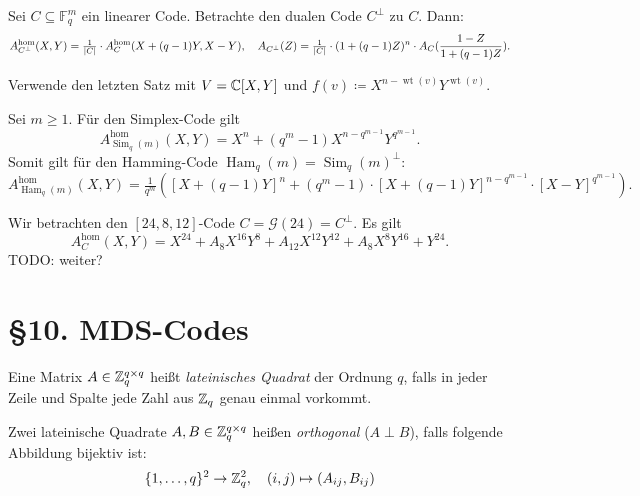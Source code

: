 \documentclass{cheat-sheet}
\newcommand{\F}{\mathbb{F}} %
\DeclareMathOperator{\wt}{wt} %
\newcommand{\homogen}{\text{hom}} %
\DeclareMathOperator{\Ham}{Ham} %
\DeclareMathOperator{\Sim}{Sim} %
\newcommand{\Golay}{\mathcal{G}} %
\begin{document}
\begin{satz}
  Sei $C \subseteq \F_q^m$ ein linearer Code.
  Betrachte den dualen Code $C^\perp$ zu $C$.
  Dann:
  \[
    A_{C^\perp}^\homogen(X, Y) = \tfrac{1}{\abs{C}} \cdot A_C^\homogen(X + (q-1)Y, X-Y), \quad
    A_{C^\perp}(Z) = \tfrac{1}{\abs{C}} \cdot (1 + (q-1) Z)^n \cdot A_C(\frac{1-Z}{1+(q-1)Z}).
  \]
\end{satz}

\begin{beweisidee}
  Verwende den letzten Satz mit $V = \mathbb{C}[X, Y]$ und $f(v) \coloneqq X^{n - \wt(v)} Y^{\wt(v)}$.
\end{beweisidee}

\begin{bsp}
  Sei $m \geq 1$.
  Für den Simplex-Code gilt
  \[
    A_{\Sim_q(m)}^\homogen (X, Y) = X^n + (q^m - 1) X^{n - q^{m-1}} Y^{q^{m-1}}.
  \]
  Somit gilt für den Hamming-Code $\Ham_q(m) = \Sim_q(m)^\perp$:
  \[
    A_{\Ham_q(m)}^\homogen (X, Y) = \tfrac{1}{q^m} \left( [X+(q-1)Y]^n + (q^m - 1) \cdot [X + (q-1) Y]^{n - q^{m-1}} \cdot [X-Y]^{q^{m-1}} \right).
  \]
\end{bsp}

\begin{bsp}
  Wir betrachten den $[24, 8, 12]$-Code $C = \Golay(24) = C^\perp$.
  Es gilt
  \[
    A_C^\homogen (X, Y) = X^{24} + A_8 X^{16} Y^8 + A_{12} X^{12} Y^{12} + A_8 X^8 Y^{16} + Y^{24}.
  \]
  TODO: weiter?
\end{bsp}


\section{§10. MDS-Codes}


\begin{defn}
  Eine Matrix $A \in \mathbb{Z}_q^{q \times q}$ heißt \emph{lateinisches Quadrat} der Ordnung $q$, falls in jeder Zeile und Spalte jede Zahl aus $\mathbb{Z}_q$ genau einmal vorkommt.
\end{defn}

\begin{defn}
  Zwei lateinische Quadrate $A, B \in \mathbb{Z}_q^{q \times q}$ heißen \emph{orthogonal} ($A \perp B$), falls folgende Abbildung bijektiv ist:
  \[
    \{ 1, \ldots, q \}^2 \to \mathbb{Z}_q^2, \quad
    (i, j) \mapsto (A_{ij}, B_{ij})
  \]
\end{defn}
\end{document}
